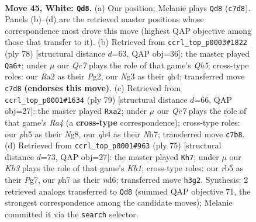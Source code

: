 \documentclass[11pt]{article}
\begin{document}
\clearpage

\begin{figure}[p]\centering
\begin{subfigure}{0.46\textwidth}\centering
\resizebox{\linewidth}{!}{%
\newchessgame
\chessboard[
  setfen={5nk1/1pQ4p/8/1r5p/1q6/6NK/R7/7R w - - 2 45},
  showmover=false,
  pgfstyle=straightmove, color=movearrow, markmove={c7-d8}
]}
\caption{}
\end{subfigure}\hfill
\begin{subfigure}{0.46\textwidth}\centering
\resizebox{\linewidth}{!}{%
\newchessgame
\chessboard[
  setfen={2k4r/2pprp2/8/1Q6/1p5q/8/5PP1/3R2K1 w - - 8 40},
  showmover=false,
  pgfstyle=straightmove, color=movearrow, markmove={b5-a6}
]}
\caption{}
\end{subfigure}
\\[4pt]
\begin{subfigure}{0.46\textwidth}\centering
\resizebox{\linewidth}{!}{%
\newchessgame
\chessboard[
  setfen={6nk/2q4n/8/r1N5/3P2Q1/2P3P1/P7/5RK1 b - - 0 40},
  showmover=false,
  pgfstyle=straightmove, color=movearrow, markmove={a5-a2}
]}
\caption{}
\end{subfigure}\hfill
\begin{subfigure}{0.46\textwidth}\centering
\resizebox{\linewidth}{!}{%
\newchessgame
\chessboard[
  setfen={5r1k/1R4p1/3N2np/8/8/6QP/2q2PP1/6K1 b - - 0 38},
  showmover=false,
  pgfstyle=straightmove, color=movearrow, markmove={h8-h7}
]}
\caption{}
\end{subfigure}
\caption{\textbf{Move 45, White: \texttt{Qd8}.} (a) Our position; Melanie plays \texttt{Qd8} (\texttt{c7d8}). Panels (b)--(d) are the retrieved master positions whose correspondence most drove this move (highest QAP objective among those that transfer to it). (b) Retrieved from \texttt{ccrl\_top\_p0003\#1822} (ply 78) [structural distance $d$=63, QAP obj=36]: the master played \texttt{Qa6+}; under $\mu$ our \emph{Qc7} plays the role of that game's \emph{Qb5}; cross-type roles: our \emph{R}a2 as their \emph{P}g2, our \emph{N}g3 as their \emph{q}h4; transferred move \texttt{c7d8} \textbf{(endorses this move)}. (c) Retrieved from \texttt{ccrl\_top\_p0001\#1634} (ply 79) [structural distance $d$=66, QAP obj=27]: the master played \texttt{Rxa2}; under $\mu$ our \emph{Qc7} plays the role of that game's \emph{Ra4} (a \textbf{cross-type} correspondence); cross-type roles: our \emph{p}h5 as their \emph{N}g8, our \emph{q}b4 as their \emph{N}h7; transferred move \texttt{c7b8}. (d) Retrieved from \texttt{ccrl\_top\_p0001\#963} (ply 75) [structural distance $d$=73, QAP obj=27]: the master played \texttt{Kh7}; under $\mu$ our \emph{Kh3} plays the role of that game's \emph{Kh1}; cross-type roles: our \emph{r}b5 as their \emph{P}g7, our \emph{p}h7 as their \emph{n}d6; transferred move \texttt{h3g2}. Synthesis: 2 retrieved analogs transferred to \texttt{Qd8} (summed QAP objective 71, the strongest correspondence among the candidate moves); Melanie committed it via the \texttt{search} selector.}
\label{fig:thought-m88}
\end{figure}
\end{document}
